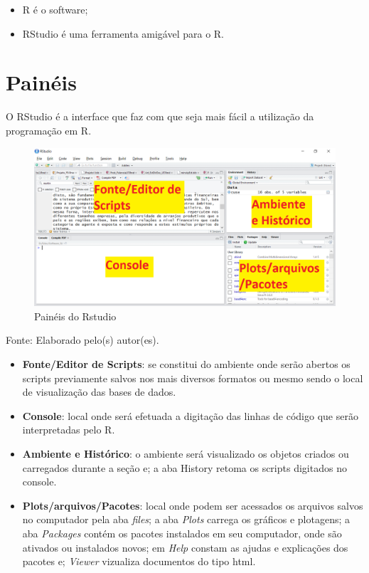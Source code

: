 \documentclass[12pt,brazil,oneside]{book}
\providecommand{\tightlist}{%
  \setlength{\itemsep}{0pt}\setlength{\parskip}{0pt}}
\begin{document}
\begin{itemize}
\tightlist
\item
  R é o software;
\item
  RStudio é uma ferramenta amigável para o R.
\end{itemize}

\hypertarget{paineis}{%
\section{Painéis}\label{paineis}}

O RStudio é a interface que faz com que seja mais fácil a utilização da programação em R.

\begin{figure}[H]

{\centering \includegraphics[width=0.8\linewidth]{paineis} 

}

\caption{Painéis do Rstudio}\label{fig:paineis1}
\end{figure}

Fonte: Elaborado pelo(s) autor(es).

\begin{itemize}
\tightlist
\item
  \textbf{Fonte/Editor de Scripts}: se constitui do ambiente onde serão abertos os scripts previamente salvos nos mais diversos formatos ou mesmo sendo o local de visualização das bases de dados.
\item
  \textbf{Console}: local onde será efetuada a digitação das linhas de código que serão interpretadas pelo R.
\item
  \textbf{Ambiente e Histórico}: o ambiente será visualizado os objetos criados ou carregados durante a seção e; a aba History retoma os scripts digitados no console.
\item
  \textbf{Plots/arquivos/Pacotes}: local onde podem ser acessados os arquivos salvos no computador pela aba \emph{files}; a aba \emph{Plots} carrega os gráficos e plotagens; a aba \emph{Packages} contém os pacotes instalados em seu computador, onde são ativados ou instalados novos; em \emph{Help} constam as ajudas e explicações dos pacotes e; \emph{Viewer} vizualiza documentos do tipo html.
\end{itemize}
\end{document}
